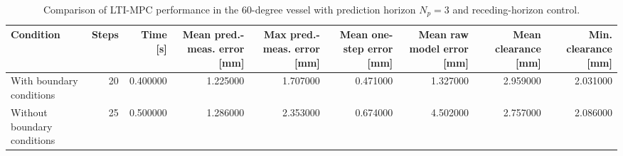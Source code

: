 \begin{table}
\caption{Comparison of LTI-MPC performance in the 60-degree vessel with prediction horizon $N_p=3$ and receding-horizon control.}
\label{tab:lti_mpc_boundary_comparison}
\begin{tabular}{lrrrrrrrr}
\toprule
Condition & Steps & Time [s] & Mean pred.-meas. error [mm] & Max pred.-meas. error [mm] & Mean one-step error [mm] & Mean raw model error [mm] & Mean clearance [mm] & Min. clearance [mm] \\
\midrule
With boundary conditions & 20 & 0.400000 & 1.225000 & 1.707000 & 0.471000 & 1.327000 & 2.959000 & 2.031000 \\
Without boundary conditions & 25 & 0.500000 & 1.286000 & 2.353000 & 0.674000 & 4.502000 & 2.757000 & 2.086000 \\
\bottomrule
\end{tabular}
\end{table}

